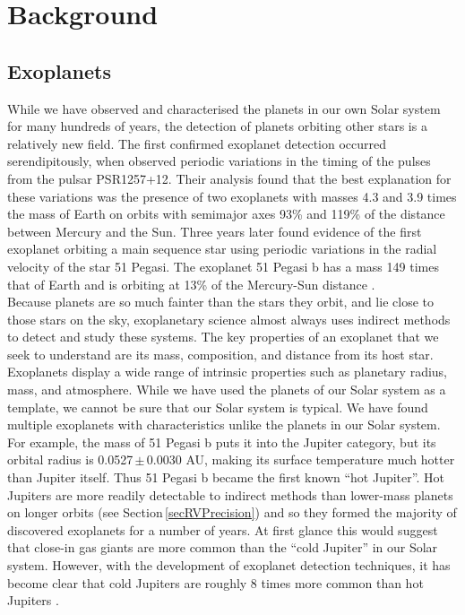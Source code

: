 \chapter{Background}
\section{Exoplanets}
While we have observed and characterised the planets in our own Solar system for many hundreds of years, the detection of planets orbiting other stars is a relatively new field. The first confirmed exoplanet detection occurred serendipitously, when \citet{1992Wolszczan} observed periodic variations in the timing of the pulses from the pulsar PSR1257+12. Their analysis found that the best explanation for these variations was the presence of two exoplanets with masses 4.3 and 3.9 times the mass of Earth on orbits with semimajor axes 93\% and 119\% of the distance between Mercury and the Sun. Three years later \citet{1995Mayor} found evidence of the first exoplanet orbiting a main sequence star using periodic variations in the radial velocity of the star 51 Pegasi. The exoplanet 51 Pegasi b has a mass 149 times that of Earth and is orbiting at 13\% of the Mercury-Sun distance \citep{2006Butler}.\\ 

Because planets are so much fainter than the stars they orbit, and lie close to those stars on the sky, exoplanetary science almost always uses indirect methods to detect and study these systems. The key properties of an exoplanet that we seek to understand are its mass, composition, and distance from its host star. Exoplanets display a wide range of intrinsic properties such as planetary radius, mass, and atmosphere. While we have used the planets of our Solar system as a template, we cannot be sure that our Solar system is typical. We have found multiple exoplanets with characteristics unlike the planets in our Solar system. For example, the mass of 51 Pegasi b puts it into the Jupiter category, but its orbital radius is 0.0527\,$\pm$\,0.0030 AU, making its surface temperature much hotter than Jupiter itself. Thus 51 Pegasi b became the first known ``hot Jupiter''. Hot Jupiters are more readily detectable to indirect methods than lower-mass planets on longer orbits (see Section\,\ref{secRVPrecision}) and so they formed the majority of discovered exoplanets for a number of years. At first glance this would suggest that close-in gas giants are more common than the ``cold Jupiter'' in our Solar system. However, with the development of exoplanet detection techniques, it has become clear that cold Jupiters are roughly 8 times more common than hot Jupiters \citep{2020Wittenmyer}.\\

